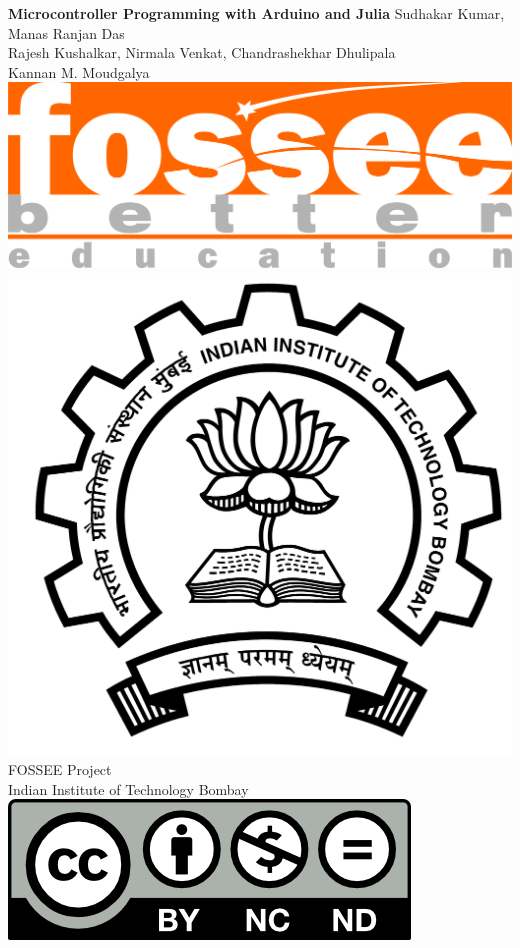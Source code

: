 \begin{center}
    {\bf {\Huge Microcontroller Programming with Arduino and Julia}}
    \vfill
    Sudhakar Kumar, Manas Ranjan Das \\
    Rajesh Kushalkar, Nirmala Venkat, Chandrashekhar Dhulipala \\
    Kannan M. Moudgalya \\
    \vfill
    \includegraphics[width=0.3\linewidth]{suppl/fossee_logo_hi.png} \quad
    \includegraphics[width=0.2\linewidth]{suppl/IITB-logo-HighRes.png} \\
    FOSSEE Project \\
    Indian Institute of Technology Bombay \\ [2mm]
    \includegraphics[width=0.15\linewidth]{suppl/by-nc-nd.png}
\end{center}

\clearpage
